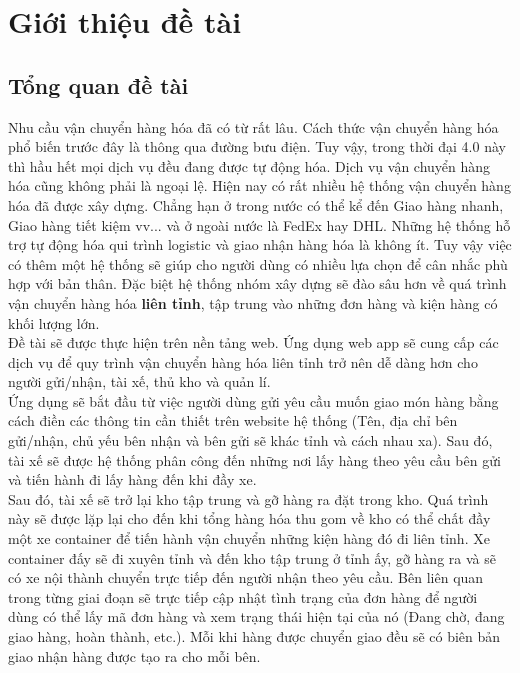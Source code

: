  \chapter{Giới thiệu đề tài}\label{chap:introduction}
	
	\section{Tổng quan đề tài}
	Nhu cầu vận chuyển hàng hóa đã có từ rất lâu. Cách thức vận chuyển hàng hóa phổ biến trước đây là thông qua đường bưu điện. Tuy vậy, trong thời đại 4.0 này thì hầu hết mọi dịch vụ đều đang được tự động hóa. Dịch vụ vận chuyển hàng hóa cũng không phải là ngoại lệ. Hiện nay có rất nhiều hệ thống vận chuyển hàng hóa đã được xây dựng. Chẳng hạn ở trong nước có thể kể đến Giao hàng nhanh, Giao hàng tiết kiệm vv... và ở ngoài nước là FedEx hay DHL. Những hệ thống hỗ trợ tự động hóa qui trình logistic và giao nhận hàng hóa là không ít. Tuy vậy việc có thêm một hệ thống sẽ giúp cho người dùng có nhiều lựa chọn để cân nhắc phù hợp với bản thân. Đặc biệt hệ thống nhóm xây dựng sẽ đào sâu hơn về quá trình vận chuyển hàng hóa
	\textbf{liên tỉnh}, tập trung vào những đơn hàng và kiện hàng có khối lượng lớn.\\
	
	Đề tài sẽ được thực hiện trên nền tảng web. Ứng dụng web app sẽ cung cấp các dịch vụ để quy trình vận chuyển hàng hóa liên tỉnh trở nên dễ dàng hơn cho người gửi/nhận, tài xế, thủ kho và quản lí.\\
	
	Ứng dụng sẽ bắt đầu từ việc người dùng gửi yêu cầu muốn giao món hàng bằng cách điền các thông tin cần thiết trên website hệ thống (Tên, địa chỉ bên gửi/nhận, chủ yếu bên nhận và bên gửi sẽ khác tỉnh và cách nhau xa). Sau đó, tài xế sẽ được hệ thống phân công đến những nơi lấy hàng theo yêu cầu bên gửi và tiến hành đi lấy hàng đến khi đầy xe.\\
	
	Sau đó, tài xế sẽ trở lại kho tập trung và gỡ hàng ra đặt trong kho. Quá trình này sẽ được lặp lại cho đến khi tổng hàng hóa thu gom về kho có thể chất đầy một xe container để tiến hành vận chuyển những kiện hàng đó đi liên tỉnh. Xe container đấy sẽ đi xuyên tỉnh và đến kho tập trung ở tỉnh ấy, gỡ hàng ra và sẽ có xe nội thành chuyển trực tiếp đến người nhận theo yêu cầu. Bên liên quan trong từng giai đoạn sẽ trực tiếp cập nhật tình trạng của đơn hàng để người dùng có thể lấy mã đơn hàng và xem trạng thái hiện tại của nó (Đang chờ, đang giao hàng, hoàn thành, etc.). Mỗi khi hàng được chuyển giao đều sẽ có biên bản giao nhận hàng được tạo ra cho mỗi bên.
	
